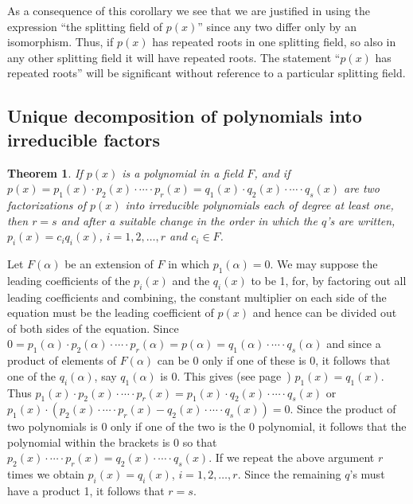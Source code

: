 \documentclass[11pt]{article}
\newtheorem{theo}{Theorem}
\theoremstyle{definition}
\begin{document}
As a consequence of this corollary we see that we are justified in using the expression ``the splitting field of $p(x)$'' since any two differ only by an isomorphism.
Thus, if $p(x)$ has repeated roots in one splitting field, so also in any other splitting field it will have repeated roots.
The statement ``$p(x)$ has repeated roots'' will be significant without reference to a particular splitting field.



\subsection{Unique decomposition of polynomials into irreducible factors}


\begin{theo}
\label{theo:onon}
If $p(x)$ is a polynomial in a field $F$, and if $p(x) = p_1(x) \cdot p_2(x) \cdot \cdots \cdot p_r(x) = q_1(x) \cdot q_2(x) \cdot \cdots \cdot q_s(x)$ are two factorizations of $p(x)$ into irreducible polynomials each of degree at least one, then $r = s$ and after a suitable change in the order in which the $q$'s are written, $p_i(x) = c_i q_i(x)$, $i = 1,2,\ldots,r$ and $c_i \in F$.
\end{theo}

Let $F(\alpha)$ be an extension of $F$ in which $p_1(\alpha) = 0$.
We may suppose the leading coefficients of the $p_i(x)$ and the $q_i(x)$ to be 1, for, by factoring out all leading coefficients and combining, the constant multiplier on each side of the equation must be the leading coefficient of $p(x)$ and hence can be divided out of both sides of the equation.
Since $0 = p_1(\alpha) \cdot p_2(\alpha) \cdot \cdots \cdot p_r(\alpha) = p(\alpha) = q_1(\alpha) \cdot \cdots \cdot q_s(\alpha)$ and since a product of elements of $F(\alpha)$ can be 0 only if one of these is 0, it follows that one of the $q_i(\alpha)$, say $q_1(\alpha)$ is 0.
This gives (see page~\pageref{p25}) $p_1(x) = q_1(x)$.
Thus $p_1(x) \cdot p_2(x) \cdot \cdots \cdot p_r(x) = p_1(x) \cdot q_2(x) \cdot \cdots \cdot q_s(x)$ or $p_1(x) \cdot (p_2(x) \cdot \cdots \cdot p_r(x) - q_2(x) \cdot \cdots \cdot q_s(x)) = 0$.
Since the product of two polynomials is $0$ only if one of the two is the $0$ polynomial, it follows that the polynomial within the brackets is 0 so that $p_2(x) \cdot \cdots \cdot p_r(x) = q_2(x) \cdot \cdots \cdot q_s(x)$.
If we repeat the above argument $r$ times we obtain $p_i(x) = q_i(x)$, $i = 1,2,\ldots, r$.
Since the remaining $q$'s must have a product 1, it follows that $r = s$.
\end{document}
